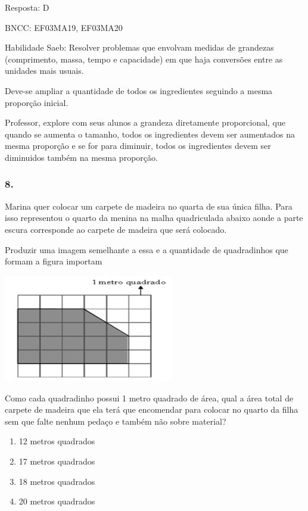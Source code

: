 Resposta: D

BNCC: EF03MA19, EF03MA20

Habilidade Saeb: Resolver problemas que envolvam medidas de grandezas
(comprimento, massa, tempo e capacidade) em que haja conversões entre as
unidades mais usuais.

Deve-se ampliar a quantidade de todos os ingredientes seguindo a mesma
proporção inicial.

Professor, explore com seus alunos a grandeza diretamente proporcional,
que quando se aumenta o tamanho, todos os ingredientes devem ser
aumentados na mesma proporção e se for para diminuir, todos os
ingredientes devem ser diminuidos também na mesma proporção.

\subsubsection{8.}\label{section-163}

Marina quer colocar um carpete de madeira no quarta de sua única filha.
Para isso representou o quarto da menina na malha quadriculada abaixo
aonde a parte escura corresponde ao carpete de madeira que será
colocado.

Produzir uma imagem semelhante a essa e a quantidade de quadradinhos que
formam a figura importam

\includegraphics[width=2.90385in,height=1.84662in]{media/image123.png}

Como cada quadradinho possui 1 metro quadrado de área, qual a área total
de carpete de madeira que ela terá que encomendar para colocar no quarto
da filha sem que falte nenhum pedaço e também não sobre material?

\begin{enumerate}
\def\labelenumi{\alph{enumi})}
\item
  12 metros quadrados
\item
  17 metros quadrados
\item
  18 metros quadrados
\item
  20 metros quadrados
\end{enumerate}

